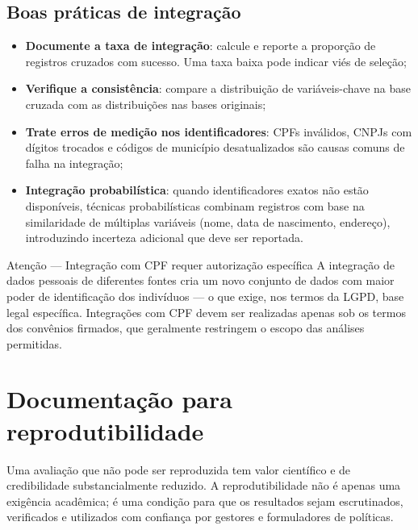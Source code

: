 \subsection{Boas práticas de integração}

\begin{itemize}
  \item \textbf{Documente a taxa de integração}: calcule e reporte a proporção de registros cruzados com sucesso. Uma taxa baixa pode indicar viés de seleção;

  \item \textbf{Verifique a consistência}: compare a distribuição de variáveis-chave na base cruzada com as distribuições nas bases originais;

  \item \textbf{Trate erros de medição nos identificadores}: CPFs inválidos, CNPJs com dígitos trocados e códigos de município desatualizados são causas comuns de falha na integração;

  \item \textbf{Integração probabilística}: quando identificadores exatos não estão disponíveis, técnicas probabilísticas combinam registros com base na similaridade de múltiplas variáveis (nome, data de nascimento, endereço), introduzindo incerteza adicional que deve ser reportada.
\end{itemize}

\begin{boxatencao}{Atenção --- Integração com CPF requer autorização específica}
A integração de dados pessoais de diferentes fontes cria um novo conjunto de dados com maior poder de identificação dos indivíduos --- o que exige, nos termos da LGPD, base legal específica. Integrações com CPF devem ser realizadas apenas sob os termos dos convênios firmados, que geralmente restringem o escopo das análises permitidas.
\end{boxatencao}

\section{Documentação para reprodutibilidade}

Uma avaliação que não pode ser reproduzida tem valor científico e de credibilidade substancialmente reduzido. A reprodutibilidade não é apenas uma exigência acadêmica; é uma condição para que os resultados sejam escrutinados, verificados e utilizados com confiança por gestores e formuladores de políticas.


